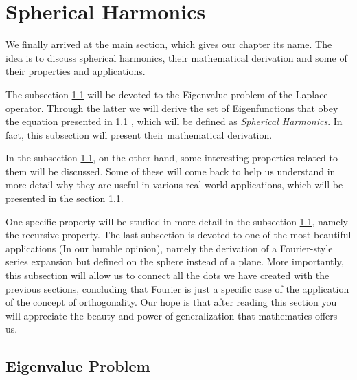 
\section{Spherical Harmonics}

We finally arrived at the main section, which gives our chapter its name. The
idea is to discuss spherical harmonics, their mathematical derivation and some
of their properties and applications.

The subsection \ref{}  will be devoted to the
Eigenvalue problem of the Laplace operator. Through the latter we will derive
the set of Eigenfunctions that obey the equation presented in \ref{}
, which will be defined as
\emph{Spherical Harmonics}. In fact, this subsection will present their
mathematical derivation.

In the subsection \ref{}, on the other hand, some interesting properties
related to them will be discussed. Some of these will come back to help us
understand in more detail why they are useful in various real-world
applications, which will be presented in the section \ref{}.

One specific property will be studied in more detail in the subsection \ref{},
namely the recursive property.  The last subsection is devoted to one of the
most beautiful applications (In our humble opinion), namely the derivation of a
Fourier-style series expansion but defined on the sphere instead of a plane.
More importantly, this subsection will allow us to connect all the dots we have
created with the previous sections, concluding that Fourier is just a specific
case of the application of the concept of orthogonality. Our hope is that after
reading this section you will appreciate the beauty and power of generalization
that mathematics offers us.
\fi

\subsection{Eigenvalue Problem}

